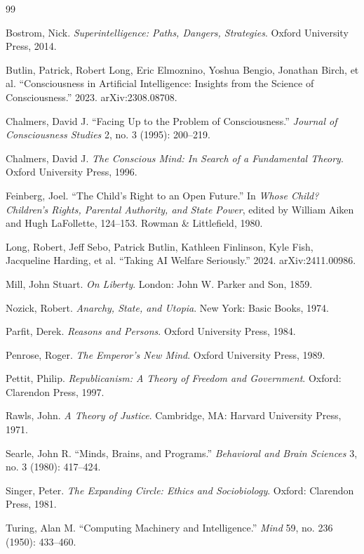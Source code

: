 \documentclass[11pt,letterpaper]{article}
\begin{document}
\newpage
\begin{thebibliography}{99}

Bostrom, Nick. \textit{Superintelligence: Paths, Dangers, Strategies}. Oxford University Press, 2014.

Butlin, Patrick, Robert Long, Eric Elmoznino, Yoshua Bengio, Jonathan Birch, et al. ``Consciousness in Artificial Intelligence: Insights from the Science of Consciousness.'' 2023. arXiv:2308.08708.

Chalmers, David J. ``Facing Up to the Problem of Consciousness.'' \textit{Journal of Consciousness Studies} 2, no. 3 (1995): 200--219.

Chalmers, David J. \textit{The Conscious Mind: In Search of a Fundamental Theory}. Oxford University Press, 1996.

Feinberg, Joel. ``The Child's Right to an Open Future.'' In \textit{Whose Child? Children's Rights, Parental Authority, and State Power}, edited by William Aiken and Hugh LaFollette, 124--153. Rowman \& Littlefield, 1980.

Long, Robert, Jeff Sebo, Patrick Butlin, Kathleen Finlinson, Kyle Fish, Jacqueline Harding, et al. ``Taking AI Welfare Seriously.'' 2024. arXiv:2411.00986.

Mill, John Stuart. \textit{On Liberty}. London: John W. Parker and Son, 1859.

Nozick, Robert. \textit{Anarchy, State, and Utopia}. New York: Basic Books, 1974.

Parfit, Derek. \textit{Reasons and Persons}. Oxford University Press, 1984.

Penrose, Roger. \textit{The Emperor's New Mind}. Oxford University Press, 1989.

Pettit, Philip. \textit{Republicanism: A Theory of Freedom and Government}. Oxford: Clarendon Press, 1997.

Rawls, John. \textit{A Theory of Justice}. Cambridge, MA: Harvard University Press, 1971.

Searle, John R. ``Minds, Brains, and Programs.'' \textit{Behavioral and Brain Sciences} 3, no. 3 (1980): 417--424.

Singer, Peter. \textit{The Expanding Circle: Ethics and Sociobiology}. Oxford: Clarendon Press, 1981.

Turing, Alan M. ``Computing Machinery and Intelligence.'' \textit{Mind} 59, no. 236 (1950): 433--460.

\end{thebibliography}
\end{document}
